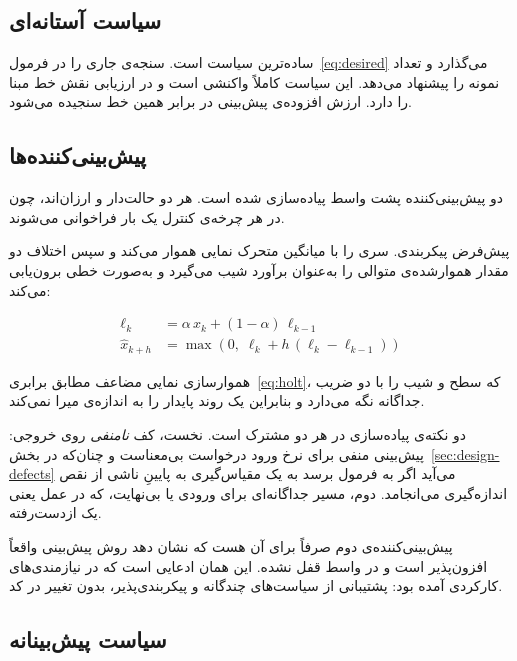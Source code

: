 \subsection{سیاست آستانه‌ای}
\label{sec:design-threshold}

ساده‌ترین سیاست است. سنجه‌ی جاری را در فرمول~\ref{eq:desired} می‌گذارد و تعداد نمونه را
پیشنهاد می‌دهد. این سیاست کاملاً واکنشی است و در ارزیابی نقش خط مبنا را دارد. ارزش افزوده‌ی
پیش‌بینی در برابر همین خط سنجیده می‌شود.

\subsection{پیش‌بینی‌کننده‌ها}
\label{sec:design-forecasters}

دو پیش‌بینی‌کننده پشت واسط  پیاده‌سازی شده است. هر دو حالت‌دار و ارزان‌اند،
چون در هر چرخه‌ی کنترل یک بار فراخوانی می‌شوند.

\textbf{} \mdash{} پیش‌فرض پیکربندی. سری را با میانگین متحرک نمایی هموار می‌کند و
سپس اختلاف دو مقدار هموارشده‌ی متوالی را به‌عنوان برآورد شیب می‌گیرد و به‌صورت خطی برون‌یابی
می‌کند:

\begin{align}
\label{eq:ewmatrend}
\ell_k &= \alpha\, x_k + (1-\alpha)\, \ell_{k-1} \\
\hat{x}_{k+h} &= \max\!\left(0,\; \ell_k + h\,(\ell_k - \ell_{k-1})\right)
\end{align}

\textbf{} \mdash{} هموارسازی نمایی مضاعف مطابق برابری~\ref{eq:holt}، که سطح و شیب را با
دو ضریب جداگانه نگه می‌دارد و بنابراین یک روند پایدار را به اندازه‌ی  میرا
نمی‌کند.

دو نکته‌ی پیاده‌سازی در هر دو مشترک است. نخست، کف \emph{نامنفی} روی خروجی: پیش‌بینی منفی برای
نرخ ورود درخواست بی‌معناست و \mdash{} چنان‌که در بخش~\ref{sec:design-defects} می‌آید \mdash{} اگر به
فرمول برسد به یک مقیاس‌گیری به پایینِ ناشی از نقص اندازه‌گیری می‌انجامد. دوم، مسیر جداگانه‌ای
برای ورودی  یا بی‌نهایت، که در عمل یعنی یک  ازدست‌رفته.

پیش‌بینی‌کننده‌ی دوم صرفاً برای آن هست که نشان دهد روش پیش‌بینی واقعاً افزون‌پذیر است و در
واسط قفل نشده. این همان ادعایی است که در نیازمندی‌های کارکردی آمده بود: پشتیبانی از سیاست‌های
چندگانه و پیکربندی‌پذیر، بدون تغییر در کد.

\subsection{سیاست پیش‌بینانه}
\label{sec:design-predictive}


